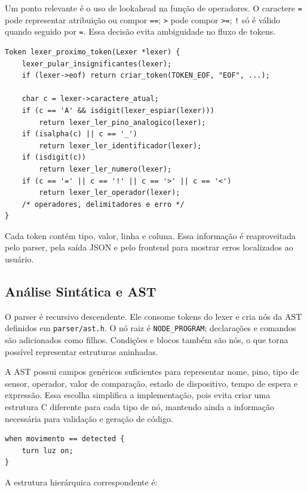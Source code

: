 \documentclass[conference]{IEEEtran}
\begin{document}
Um ponto relevante é o uso de lookahead na função de operadores. O caractere \texttt{=} pode representar atribuição ou compor \texttt{==}; \texttt{>} pode compor \texttt{>=}; \texttt{!} só é válido quando seguido por \texttt{=}. Essa decisão evita ambiguidade no fluxo de tokens.

\begin{lstlisting}[style=csmall,caption={Fluxo simplificado do lexer.},label={lst:lexer}]
Token lexer_proximo_token(Lexer *lexer) {
    lexer_pular_insignificantes(lexer);
    if (lexer->eof) return criar_token(TOKEN_EOF, "EOF", ...);

    char c = lexer->caractere_atual;
    if (c == 'A' && isdigit(lexer_espiar(lexer)))
        return lexer_ler_pino_analogico(lexer);
    if (isalpha(c) || c == '_')
        return lexer_ler_identificador(lexer);
    if (isdigit(c))
        return lexer_ler_numero(lexer);
    if (c == '=' || c == '!' || c == '>' || c == '<')
        return lexer_ler_operador(lexer);
    /* operadores, delimitadores e erro */
}
\end{lstlisting}

Cada token contém tipo, valor, linha e coluna. Essa informação é reaproveitada pelo parser, pela saída JSON e pelo frontend para mostrar erros localizados ao usuário.

\subsection{Análise Sintática e AST}
O parser é recursivo descendente. Ele consome tokens do lexer e cria nós da AST definidos em \texttt{parser/ast.h}. O nó raiz é \texttt{NODE\_PROGRAM}; declarações e comandos são adicionados como filhos. Condições e blocos também são nós, o que torna possível representar estruturas aninhadas.

A AST possui campos genéricos suficientes para representar nome, pino, tipo de sensor, operador, valor de comparação, estado de dispositivo, tempo de espera e expressão. Essa escolha simplifica a implementação, pois evita criar uma estrutura C diferente para cada tipo de nó, mantendo ainda a informação necessária para validação e geração de código.

\begin{lstlisting}[style=homescript,caption={Entrada usada para exemplo de AST.},label={lst:astinput}]
when movimento == detected {
    turn luz on;
}
\end{lstlisting}

A estrutura hierárquica correspondente é:
\end{document}
